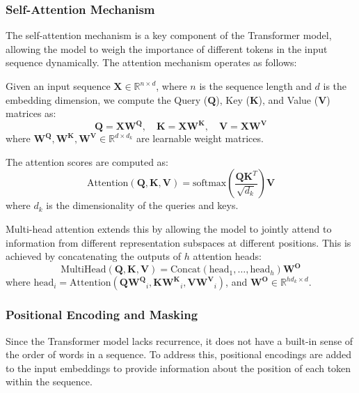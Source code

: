 \subsubsection{Self-Attention Mechanism}

The self-attention mechanism is a key component of the Transformer model, allowing the model to weigh the importance of different tokens in the input sequence dynamically. The attention mechanism operates as follows:

Given an input sequence \(\mathbf{X} \in \mathbb{R}^{n \times d}\), where \(n\) is the sequence length and \(d\) is the embedding dimension, we compute the Query (\(\mathbf{Q}\)), Key (\(\mathbf{K}\)), and Value (\(\mathbf{V}\)) matrices as:
\begin{equation}
     \mathbf{Q} = \mathbf{X}\mathbf{W^Q}, \quad \mathbf{K} = \mathbf{XW^K}, \quad \mathbf{V} = \mathbf{XW^V}
\end{equation}
where \(\mathbf{W^Q}, \mathbf{W^K}, \mathbf{W^V} \in \mathbb{R}^{d \times d_k}\) are learnable weight matrices.

The attention scores are computed as:
\begin{equation}
    \text{Attention}(\mathbf{Q}, \mathbf{K}, \mathbf{V}) = \text{softmax}\left(\frac{\mathbf{Q}\mathbf{K}^T}{\sqrt{d_k}}\right)\mathbf{V}
\end{equation}
where \(d_k\) is the dimensionality of the queries and keys.

Multi-head attention extends this by allowing the model to jointly attend to information from different representation subspaces at different positions. This is achieved by concatenating the outputs of \(h\) attention heads:
\begin{equation}
    \text{MultiHead}(\mathbf{Q}, \mathbf{K}, \mathbf{V}) = \text{Concat}(\text{head}_1, \ldots, \text{head}_h)\mathbf{W^O}
\end{equation}
where \(\text{head}_i = \text{Attention}(\mathbf{Q}\mathbf{W^Q}_i, \mathbf{K}\mathbf{W^K}_i, \mathbf{V}\mathbf{W^V}_i)\), and \(\mathbf{W^O} \in \mathbb{R}^{hd_k \times d}\).

\subsubsection{Positional Encoding and Masking}

Since the Transformer model lacks recurrence, it does not have a built-in sense of the order of words in a sequence. To address this, positional encodings are added to the input embeddings to provide information about the position of each token within the sequence.

